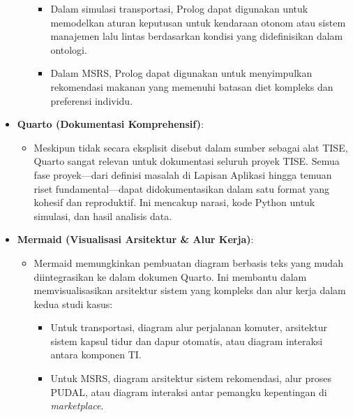 \documentclass[
  letterpaper,
  DIV=11,
  numbers=noendperiod]{scrreprt}
\providecommand{\tightlist}{%
  \setlength{\itemsep}{0pt}\setlength{\parskip}{0pt}}
\begin{document}
\begin{itemize}
\begin{itemize}
    \begin{itemize}
    \tightlist
    \item
      Dalam simulasi transportasi, Prolog dapat digunakan untuk
      memodelkan aturan keputusan untuk kendaraan otonom atau sistem
      manajemen lalu lintas berdasarkan kondisi yang didefinisikan dalam
      ontologi.
    \item
      Dalam MSRS, Prolog dapat digunakan untuk menyimpulkan rekomendasi
      makanan yang memenuhi batasan diet kompleks dan preferensi
      individu.
    \end{itemize}
  \end{itemize}
\item
  \textbf{Quarto (Dokumentasi Komprehensif)}:

  \begin{itemize}
  \tightlist
  \item
    Meskipun tidak secara eksplisit disebut dalam sumber sebagai alat
    TISE, Quarto sangat relevan untuk dokumentasi seluruh proyek TISE.
    Semua fase proyek---dari definisi masalah di Lapisan Aplikasi hingga
    temuan riset fundamental---dapat didokumentasikan dalam satu format
    yang kohesif dan reproduktif. Ini mencakup narasi, kode Python untuk
    simulasi, dan hasil analisis data.
  \end{itemize}
\item
  \textbf{Mermaid (Visualisasi Arsitektur \& Alur Kerja)}:

  \begin{itemize}
  \tightlist
  \item
    Mermaid memungkinkan pembuatan diagram berbasis teks yang mudah
    diintegrasikan ke dalam dokumen Quarto. Ini membantu dalam
    memvisualisasikan arsitektur sistem yang kompleks dan alur kerja
    dalam kedua studi kasus:

    \begin{itemize}
    \tightlist
    \item
      Untuk transportasi, diagram alur perjalanan komuter, arsitektur
      sistem kapsul tidur dan dapur otomatis, atau diagram interaksi
      antara komponen TI.
    \item
      Untuk MSRS, diagram arsitektur sistem rekomendasi, alur proses
      PUDAL, atau diagram interaksi antar pemangku kepentingan di
      \emph{marketplace}.
    \end{itemize}
  \end{itemize}
\end{itemize}
\end{document}
